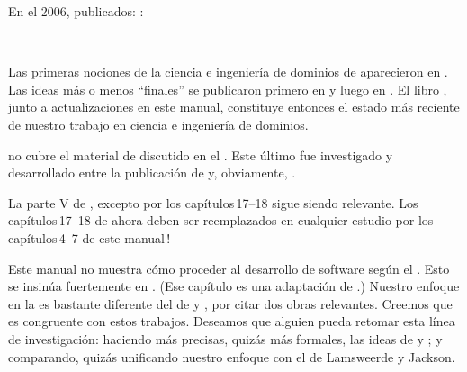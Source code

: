 
\begynd
\pind En el 2006,  publicados: \cite{TheSEBook1,TheSEBook2,TheSEBook3}:
\afslut

\begin{center}
\ \
\ \
\end{center}

\label{Domain Engineering 2016 2022}
\begynd
\pind Las primeras nociones de la ciencia e ingeniería de dominios de
      \cite{BjornerMonograph2020} aparecieron en \cite[2010]{Kiev:2010ptI,Kiev:2010ptII}.
\pind Las ideas más o menos ``finales'' se publicaron primero en \cite[2017]{BjornerFAoC2015MDAAD} y 
      luego en \cite[marzo de 2019]{BjornerTOSEM2018}.
\pind El libro \cite{BjornerMonograph2020}, junto a actualizaciones en este
      manual, constituye entonces el estado más reciente de nuestro trabajo en ciencia
      e ingeniería de dominios.

\pind \cite[Ingeniería de Software, III, parte V]{TheSEBook3} no
      cubre el material de  discutido en el
      \cite[capítulo 8: Facetas del Dominio]{BjornerMonograph2020}.
\begynd
\pind Este último fue investigado \cite{dines:facs:2008} y desarrollado entre la publicación
      de \cite{TheSEBook3} y, obviamente, \cite{BjornerMonograph2020}.
\afslut
\afslut

\begynd
\pind La parte V de \cite{TheSEBook3}, excepto por los capítulos\,17--18 sigue siendo
      relevante.
\pind Los capítulos\,17--18 de \cite{TheSEBook3} ahora deben ser reemplazados en
      cualquier estudio por los capítulos\,4--7 de \cite{BjornerMonograph2020} 
      este manual\,!
\afslut


\begynd
\pind Este manual no muestra cómo proceder al desarrollo de software según el .
\begynd
\pind Esto se insinúa fuertemente en \cite[Capítulo 9]{BjornerMonograph2020}.
\pind (Ese capítulo es una adaptación de \cite[mayo de 2008]{dines:ugo65:2008}.)
\pind Nuestro enfoque en la \sfsl{ingeniería de requisitos} es bastante
      diferente del de \cite[A. van Laamswerde]{Lamsweerde} y
      \cite[M.\ A.\ Jackson]{Jackson2010Facs}, por citar dos obras
      relevantes.
\pind Creemos  que es congruente con estos trabajos.
\pind Deseamos \ysfchg{firmemente} que alguien pueda retomar esta línea de investigación:
\begynd
\pind haciendo más precisas, quizás más formales, las ideas de
       y ;
\pind y comparando, quizás unificando nuestro enfoque con el de
      Lamsweerde y Jackson.
\afslut
\afslut
\afslut
{}

